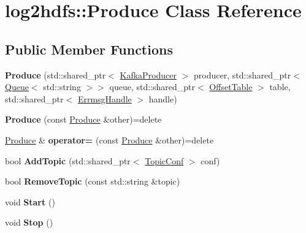 \hypertarget{classlog2hdfs_1_1Produce}{}\section{log2hdfs\+:\+:Produce Class Reference}
\label{classlog2hdfs_1_1Produce}
\subsection*{Public Member Functions}
\begin{DoxyCompactItemize}
\item 
{\bfseries Produce} (std\+::shared\+\_\+ptr$<$ \hyperlink{classlog2hdfs_1_1KafkaProducer}{Kafka\+Producer} $>$ producer, std\+::shared\+\_\+ptr$<$ \hyperlink{classlog2hdfs_1_1Queue}{Queue}$<$ std\+::string $>$$>$ queue, std\+::shared\+\_\+ptr$<$ \hyperlink{classlog2hdfs_1_1OffsetTable}{Offset\+Table} $>$ table, std\+::shared\+\_\+ptr$<$ \hyperlink{classlog2hdfs_1_1ErrmsgHandle}{Errmsg\+Handle} $>$ handle)\hypertarget{classlog2hdfs_1_1Produce_a35835c280742511713c677550b5f6c19}{}\label{classlog2hdfs_1_1Produce_a35835c280742511713c677550b5f6c19}

\item 
{\bfseries Produce} (const \hyperlink{classlog2hdfs_1_1Produce}{Produce} \&other)=delete\hypertarget{classlog2hdfs_1_1Produce_ab5410ff28e9b97b0a08bc8fcc75e1f7e}{}\label{classlog2hdfs_1_1Produce_ab5410ff28e9b97b0a08bc8fcc75e1f7e}

\item 
\hyperlink{classlog2hdfs_1_1Produce}{Produce} \& {\bfseries operator=} (const \hyperlink{classlog2hdfs_1_1Produce}{Produce} \&other)=delete\hypertarget{classlog2hdfs_1_1Produce_a0869388f0275465fa269d06b7e2f9723}{}\label{classlog2hdfs_1_1Produce_a0869388f0275465fa269d06b7e2f9723}

\item 
bool {\bfseries Add\+Topic} (std\+::shared\+\_\+ptr$<$ \hyperlink{classlog2hdfs_1_1TopicConf}{Topic\+Conf} $>$ conf)\hypertarget{classlog2hdfs_1_1Produce_acd7d39a0b8572f81cf004454638a8f0c}{}\label{classlog2hdfs_1_1Produce_acd7d39a0b8572f81cf004454638a8f0c}

\item 
bool {\bfseries Remove\+Topic} (const std\+::string \&topic)\hypertarget{classlog2hdfs_1_1Produce_a66ad911b38d458ebc4b2de1f02629528}{}\label{classlog2hdfs_1_1Produce_a66ad911b38d458ebc4b2de1f02629528}

\item 
void {\bfseries Start} ()\hypertarget{classlog2hdfs_1_1Produce_a732e3fe94536a5b44cc9511d5e60210f}{}\label{classlog2hdfs_1_1Produce_a732e3fe94536a5b44cc9511d5e60210f}

\item 
void {\bfseries Stop} ()\hypertarget{classlog2hdfs_1_1Produce_a88b10808a0956625e4c02948c6545092}{}\label{classlog2hdfs_1_1Produce_a88b10808a0956625e4c02948c6545092}

\end{DoxyCompactItemize}
